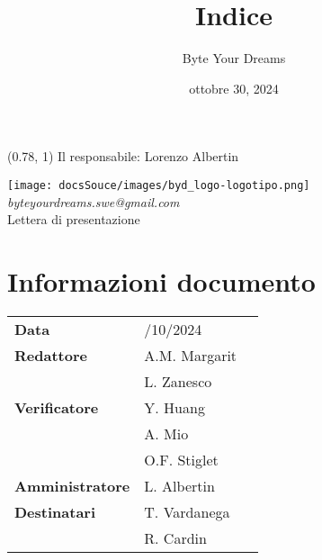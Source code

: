 \documentclass{article}
\title{\textbf{\fontsize{28}{6}\selectfont Indice}}
\author{\fontsize{14}{6}\selectfont Byte Your Dreams}
\date{ottobre 30, 2024}
\begin{document}
\begin{textblock*}{\textwidth}(0.78\textwidth, 1\textheight)
    Il responsabile: Lorenzo Albertin
\end{textblock*}
\pagestyle{fancy}
\begin{center}
\vspace*{-2cm}
\texttt{[image: docsSouce/images/byd\_logo-logotipo.png]}
\fontsize{12}{6}\textcolor[RGB]{60, 60, 60} 
{\textit{byteyourdreams.swe@gmail.com}} \\
\vspace{0.5cm}
\fontsize{16}{6}\selectfont Lettera di presentazione \\
\vspace{0.5cm}
\end{center}

\section*{Informazioni documento}
\def\arraystretch{1.2}
\begin{tabular}{>{\raggedleft\arraybackslash}p{}|>{\raggedright\arraybackslash}p{}c}
\hline
\addlinespace
\textbf{Data} & 30/10/2024 \vspace{10pt} \\
\textbf{Redattore} & A.M. Margarit  \\ & L. Zanesco \vspace{10pt} \\
\textbf{Verificatore} & Y. Huang  \\ & A. Mio \\ & O.F. Stiglet \vspace{10pt} \\
\textbf{Amministratore} & L. Albertin \vspace{10pt} \\
\textbf{Destinatari} & T. Vardanega \\ & R. Cardin \vspace{10pt}
\end{tabular}

\pagebreak 





\flushleft
\end{document}
